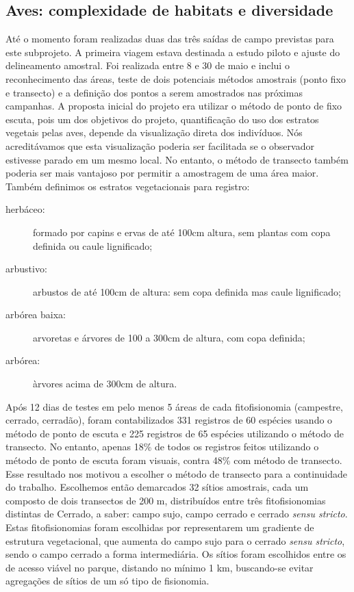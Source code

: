 \subsection{Aves: complexidade de habitats e diversidade} %
\label{sec:compl-de-habit} 

Até o momento foram realizadas duas das três saídas de campo previstas
para este subprojeto. A primeira viagem estava destinada a estudo piloto
e ajuste do delineamento amostral. Foi realizada entre 8 e 30 de
maio e inclui o reconhecimento das áreas, teste de dois
potenciais métodos amostrais (ponto fixo e transecto) e a definição dos pontos a serem
amostrados nas próximas campanhas. 
A proposta inicial do projeto era utilizar o método de ponto de
fixo escuta, pois um dos objetivos do projeto, quantificação do uso dos
estratos vegetais pelas aves, depende da visualização direta dos
indivíduos. Nós acreditávamos que esta visualização poderia ser
facilitada se o observador estivesse parado em um mesmo local. No
entanto, o método de transecto também poderia ser mais vantajoso por
permitir a amostragem de uma área maior. 
Também definimos os estratos vegetacionais para registro: 
\begin{description}
\item[herbáceo:] formado por capins e ervas de até 100cm altura, sem plantas com copa definida ou caule lignificado;
\item[arbustivo:] arbustos de até 100cm de altura: sem copa definida mas caule lignificado;
\item[arbórea baixa:] arvoretas e árvores de 100 a 300cm de altura, com copa definida;
\item[arbórea:] àrvores acima de 300cm de altura. 
\end{description}

 Após 12 dias de testes em 
pelo menos 5 áreas de cada fitofisionomia (campestre, cerrado, cerradão),
foram contabilizados 331 registros de 60 espécies usando o método de
ponto de escuta e 225 registros de 65 espécies utilizando o método de
transecto. No entanto, apenas 18\% de todos os registros feitos
utilizando o método de ponto de escuta foram visuais, contra 48\%
com  método de transecto.  Esse resultado nos motivou a escolher o método de
transecto para a continuidade do trabalho.
Escolhemos então demarcados 32 sítios amostrais,
cada um composto de dois transectos de 200 m, distribuídos entre três
fitofisionomias distintas de Cerrado, a saber: campo sujo, campo
cerrado e cerrado \textit{sensu stricto}. Estas fitofisionomias foram
escolhidas por representarem um gradiente de estrutura vegetacional,
que aumenta do campo sujo para o cerrado \textit{sensu stricto}, sendo
o campo cerrado a forma intermediária. Os sítios foram escolhidos entre
os de acesso viável no parque, distando no mínimo 1 km, buscando-se
evitar agregações de sítios de um só tipo de fisionomia.

